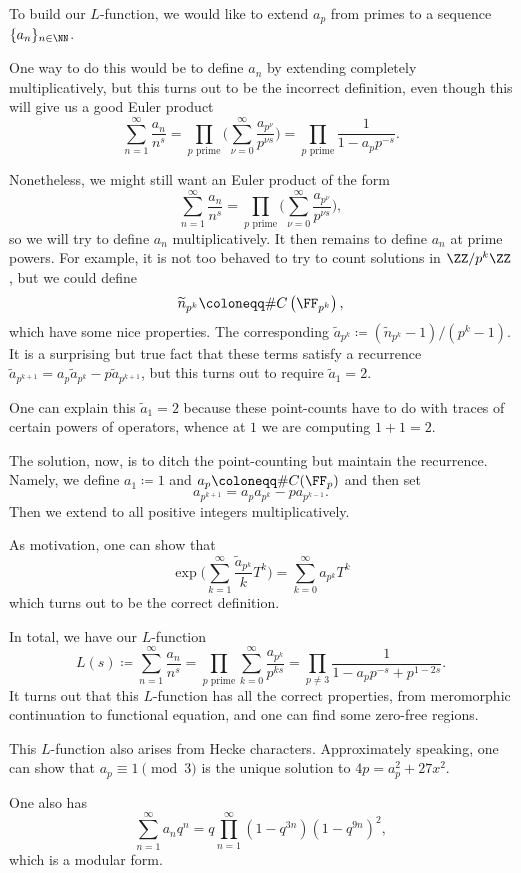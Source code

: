 \documentclass{article}
\begin{document}
To build our $L$-function, we would like to extend $a_p$ from primes to a sequence $\{a_n\}_{n\in\NN}$.
\begin{remark}
	One way to do this would be to define $a_n$ by extending completely multiplicatively, but this turns out to be the incorrect definition, even though this will give us a good Euler product
	\[\sum_{n=1}^\infty\frac{a_n}{n^s}=\prod_{p\text{ prime}}\Bigg(\sum_{\nu=0}^\infty\frac{a_{p^\nu}}{p^{\nu s}}\Bigg)=\prod_{p\text{ prime}}\frac1{1-a_pp^{-s}}.\]
\end{remark}
Nonetheless, we might still want an Euler product of the form
\[\sum_{n=1}^\infty\frac{a_n}{n^s}=\prod_{p\text{ prime}}\Bigg(\sum_{\nu=0}^\infty\frac{a_{p^\nu}}{p^{\nu s}}\Bigg),\]
so we will try to define $a_n$ multiplicatively. It then remains to define $a_n$ at prime powers. For example, it is not too behaved to try to count solutions in $\ZZ/p^k\ZZ$, but we could define
\[\widetilde n_{p^k}\coloneqq\#C\left(\FF_{p^k}\right),\]
which have some nice properties. The corresponding $\widetilde a_{p^k}\coloneqq\left(\widetilde n_{p^k}-1\right)/\left(p^k-1\right)$. It is a surprising but true fact that these terms satisfy a recurrence $\widetilde a_{p^{k+1}}=a_p\widetilde a_{p^k}-p\widetilde a_{p^{k+1}}$, but this turns out to require $\widetilde a_1=2$.
\begin{remark}
	One can explain this $\widetilde a_1=2$ because these point-counts have to do with traces of certain powers of operators, whence at $1$ we are computing $1+1=2$.
\end{remark}
The solution, now, is to ditch the point-counting but maintain the recurrence. Namely, we define $a_1\coloneqq1$ and $a_p\coloneqq\#C(\FF_p)$ and then set
\[a_{p^{k+1}}=a_pa_{p^k}-pa_{p^{k-1}}.\]
Then we extend to all positive integers multiplicatively.
\begin{remark}
	As motivation, one can show that
	\[\exp\Bigg(\sum_{k=1}^\infty\frac{\widetilde a_{p^k}}{k}T^k\Bigg)=\sum_{k=0}^\infty a_{p^k}T^k\]
	which turns out to be the correct definition.
\end{remark}
In total, we have our $L$-function
\[L(s)\coloneqq\sum_{n=1}^\infty\frac{a_n}{n^s}=\prod_{p\text{ prime}}\sum_{k=0}^\infty\frac{a_{p^k}}{p^{ks}}=\prod_{p\ne3}\frac1{1-a_pp^{-s}+p^{1-2s}}.\]
It turns out that this $L$-function has all the correct properties, from meromorphic continuation to functional equation, and one can find some zero-free regions.
\begin{remark}
	This $L$-function also arises from Hecke characters. Approximately speaking, one can show that $a_p\equiv1\pmod3$ is the unique solution to $4p=a_p^2+27x^2$.
\end{remark}
\begin{remark}
	One also has
	\[\sum_{n=1}^\infty a_nq^n=q\prod_{n=1}^\infty\left(1-q^{3n}\right)\left(1-q^{9n}\right)^2,\]
	which is a modular form.
\end{remark}
\end{document}
